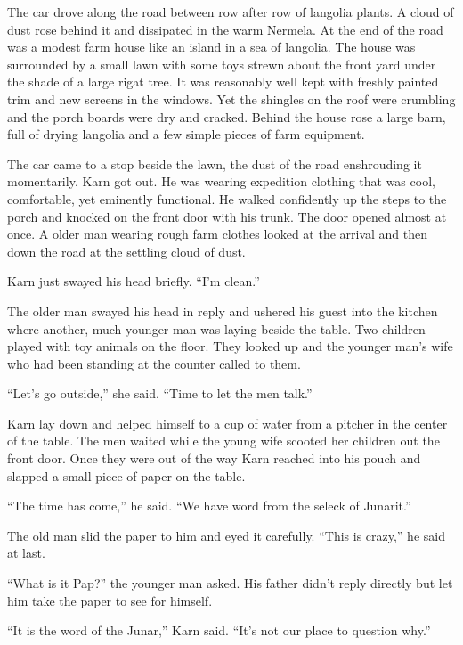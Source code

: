 

The car drove along the road between row after row of langolia plants. A cloud of dust rose
behind it and dissipated in the warm Nermela. At the end of the road was a modest farm house
like an island in a sea of langolia. The house was surrounded by a small lawn with some toys
strewn about the front yard under the shade of a large rigat tree. It was reasonably well kept
with freshly painted trim and new screens in the windows. Yet the shingles on the roof were
crumbling and the porch boards were dry and cracked. Behind the house rose a large barn, full of
drying langolia and a few simple pieces of farm equipment.

The car came to a stop beside the lawn, the dust of the road enshrouding it momentarily. Karn
got out. He was wearing expedition clothing that was cool, comfortable, yet eminently
functional. He walked confidently up the steps to the porch and knocked on the front door with
his trunk. The door opened almost at once. A older man wearing rough farm clothes looked at the
arrival and then down the road at the settling cloud of dust.

Karn just swayed his head briefly. ``I'm clean.''

The older man swayed his head in reply and ushered his guest into the kitchen where another,
much younger man was laying beside the table. Two children played with toy animals on the floor.
They looked up and the younger man's wife who had been standing at the counter called to them.

``Let's go outside,'' she said. ``Time to let the men talk.''

Karn lay down and helped himself to a cup of water from a pitcher in the center of the table.
The men waited while the young wife scooted her children out the front door. Once they were out
of the way Karn reached into his pouch and slapped a small piece of paper on the table.

``The time has come,'' he said. ``We have word from the seleck of Junarit.''

The old man slid the paper to him and eyed it carefully. ``This is crazy,'' he said at last.

``What is it Pap?'' the younger man asked. His father didn't reply directly but let him take the
paper to see for himself.

``It is the word of the Junar,'' Karn said. ``It's not our place to question why.''

